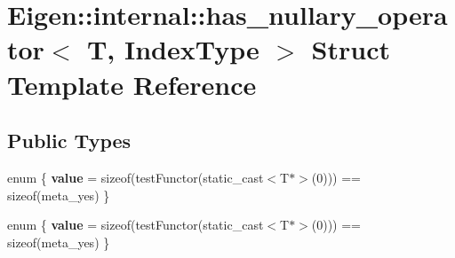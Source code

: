 \hypertarget{struct_eigen_1_1internal_1_1has__nullary__operator}{}\section{Eigen\+:\+:internal\+:\+:has\+\_\+nullary\+\_\+operator$<$ T, Index\+Type $>$ Struct Template Reference}
\label{struct_eigen_1_1internal_1_1has__nullary__operator}
\subsection*{Public Types}
\begin{DoxyCompactItemize}
\item 
\mbox{\label{struct_eigen_1_1internal_1_1has__nullary__operator_a9e9d986d5a5e8cff3ce4c9da366d2aec}} 
enum \{ {\bfseries value} = sizeof(test\+Functor(static\+\_\+cast$<$T$\ast$$>$(0))) == sizeof(meta\+\_\+yes)
 \}
\item 
\mbox{\label{struct_eigen_1_1internal_1_1has__nullary__operator_a332ced577b68cd4e1105ec0af50d92cb}} 
enum \{ {\bfseries value} = sizeof(test\+Functor(static\+\_\+cast$<$T$\ast$$>$(0))) == sizeof(meta\+\_\+yes)
 \}
\end{DoxyCompactItemize}
